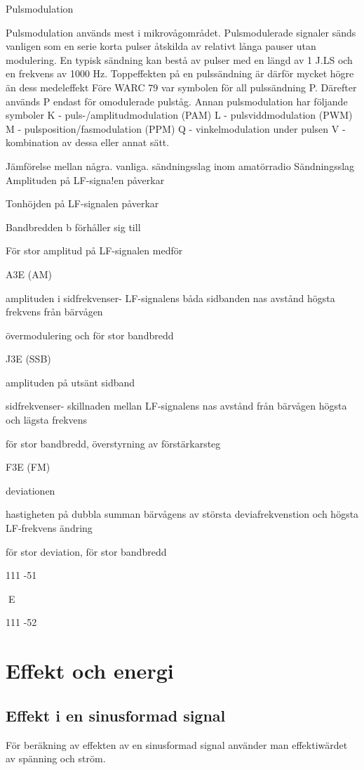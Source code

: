 \documentclass[a4paper,twoside,twocolumn,openright]{book}
\begin{document}
Pulsmodulation

Pulsmodulation används mest i mikrovågområdet. Pulsmodulerade signaler sänds
vanligen som en serie korta pulser åtskilda
av relativt långa pauser utan modulering.
En typisk sändning kan bestå av pulser
med en längd av 1 J.LS och en frekvens av
1000 Hz. Toppeffekten på en pulssändning
är därför mycket högre än dess medeleffekt
Före WARC 79 var symbolen för all pulssändning P. Därefter används P endast för
omodulerade pulståg. Annan pulsmodulation
har följande symboler
K - puls-/amplitudmodulation (PAM)
L - pulsviddmodulation (PWM)
M - pulsposition/fasmodulation (PPM)
Q - vinkelmodulation under pulsen
V - kombination av dessa eller annat sätt.

Jämförelse mellan några. vanliga. sändningsslag inom amatörradio
Sändningsslag Amplituden på
LF-signa!en
påverkar

Tonhöjden på
LF-signalen
påverkar

Bandbredden b
förhåller sig till

För stor amplitud
på LF-signalen
medför

A3E (AM)

amplituden i
sidfrekvenser- LF-signalens
båda sidbanden nas avstånd
högsta frekvens
från bärvågen

övermodulering
och för stor bandbredd

J3E (SSB)

amplituden på
utsänt sidband

sidfrekvenser- skillnaden mellan
LF-signalens
nas avstånd
från bärvågen högsta och lägsta
frekvens

för stor bandbredd,
överstyrning av
förstärkarsteg

F3E (FM)

deviationen

hastigheten på dubbla summan
bärvågens
av största deviafrekvenstion och högsta
LF-frekvens
ändring

för stor deviation,
för stor bandbredd

111 -51

E

111 -52

\cleardoublepage

\section{Effekt och energi}

\subsection{Effekt i en sinusformad signal}
För beräkning av effekten av en sinusformad signal använder man effektiwärdet
av spänning och ström.
\end{document}
